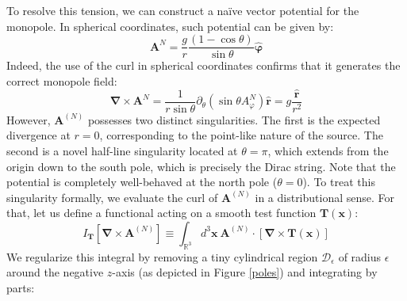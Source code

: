 \documentclass[a4paper,11pt]{article}
\begin{document}
 To resolve this tension, we can construct a naïve vector potential for the monopole. In spherical coordinates, such potential can be given by:
\begin{equation}
 \boldsymbol{A}^N = \frac{g}{r} \frac{(1 - \cos\theta)}{\sin\theta} \hat{\boldsymbol \varphi}
\end{equation}
Indeed, the use of the curl in spherical coordinates confirms that it generates the correct monopole field:
\begin{equation}
    \boldsymbol{\nabla} \times \boldsymbol{A}^N = \frac{1}{r\sin\theta} \partial_\theta (\sin\theta A^N_\varphi) \hat{\boldsymbol r} = g \frac{ \hat{\boldsymbol r}}{r^2}
\end{equation}
However, $\boldsymbol A^{(N)}$ possesses two distinct singularities. The first is the expected divergence at $r=0$, corresponding to the point-like nature of the source. The second is a novel half-line singularity located at $\theta=\pi$, which extends from the origin down to the south pole, which is precisely the Dirac string. Note that the potential is completely well-behaved at the north pole ($\theta=0$). To treat this singularity formally, we evaluate the curl of $\boldsymbol A^{(N)}$ in a distributional sense. For that, let us define a functional acting on a smooth test function $\boldsymbol T(\boldsymbol x)$:
 \begin{equation}
    I_{\boldsymbol{T}}[\boldsymbol{\nabla} \times \boldsymbol{A}^{(N)}] \equiv \int_{\mathbb{R}^3} d^3 \boldsymbol x\  \boldsymbol{A}^{(N)} \cdot [\boldsymbol{\nabla} \times \boldsymbol{T}(\boldsymbol{x})]
 \end{equation}
We regularize this integral by removing a tiny cylindrical region $\mathcal{D}_\epsilon$ of radius $\epsilon$ around the negative $z$-axis (as depicted in Figure \ref{poles}) and integrating by parts:
\end{document}
